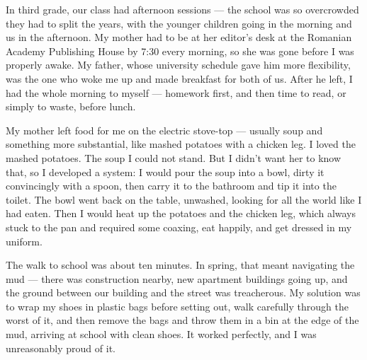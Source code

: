 \documentclass[12pt]{book}
\begin{document}
In third grade, our class had afternoon sessions --- the school was so
overcrowded they had to split the years, with the younger children going
in the morning and us in the afternoon. My mother had to be at her
editor's desk at the Romanian Academy Publishing House by 7:30 every
morning, so she was gone before I was properly awake. My father, whose
university schedule gave him more flexibility, was the one who woke me
up and made breakfast for both of us. After he left, I had the whole
morning to myself --- homework first, and then time to read, or simply
to waste, before lunch.


My mother left food for me on the electric stove-top --- usually soup
and something more substantial, like mashed potatoes with a chicken leg.
I loved the mashed potatoes. The soup I could not stand. But I didn't
want her to know that, so I developed a system: I would pour the soup
into a bowl, dirty it convincingly with a spoon, then carry it to the
bathroom and tip it into the toilet. The bowl went back on the table,
unwashed, looking for all the world like I had eaten. Then I would heat
up the potatoes and the chicken leg, which always stuck to the pan and
required some coaxing, eat happily, and get dressed in my uniform.

The walk to school was about ten minutes. In spring, that meant
navigating the mud --- there was construction nearby, new apartment
buildings going up, and the ground between our building and the street
was treacherous. My solution was to wrap my shoes in plastic bags before
setting out, walk carefully through the worst of it, and then remove the
bags and throw them in a bin at the edge of the mud, arriving at school
with clean shoes. It worked perfectly, and I was unreasonably proud of
it.
\end{document}
